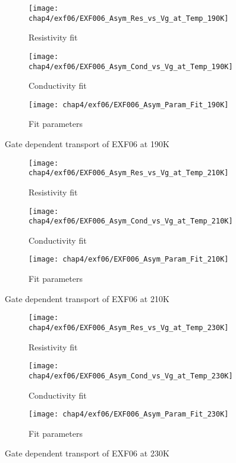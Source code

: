 \documentclass[../Matt_Gebert_Honours_Thesis.tex]{subfiles}
\begin{document}
	\begin{figure}[H]
		\centering
		\begin{subfigure}{0.4\textwidth}
			\centering
			\texttt{[image: chap4/exf06/EXF006\_Asym\_Res\_vs\_Vg\_at\_Temp\_190K]}
			\caption{Resistivity fit}
		\end{subfigure}
		\begin{subfigure}{0.4\textwidth}
			\centering
			\texttt{[image: chap4/exf06/EXF006\_Asym\_Cond\_vs\_Vg\_at\_Temp\_190K]}
			\caption{Conductivity fit}
		\end{subfigure}
		\begin{subfigure}{0.16\textwidth}
			\centering
			\texttt{[image: chap4/exf06/EXF006\_Asym\_Param\_Fit\_190K]}
			\caption{Fit parameters}
		\end{subfigure}
		\caption*{Gate dependent transport of EXF06 at 190K}
	\end{figure}
	\begin{figure}[H]
		\centering
		\begin{subfigure}{0.4\textwidth}
			\centering
			\texttt{[image: chap4/exf06/EXF006\_Asym\_Res\_vs\_Vg\_at\_Temp\_210K]}
			\caption{Resistivity fit}
		\end{subfigure}
		\begin{subfigure}{0.4\textwidth}
			\centering
			\texttt{[image: chap4/exf06/EXF006\_Asym\_Cond\_vs\_Vg\_at\_Temp\_210K]}
			\caption{Conductivity fit}
		\end{subfigure}
		\begin{subfigure}{0.16\textwidth}
			\centering
			\texttt{[image: chap4/exf06/EXF006\_Asym\_Param\_Fit\_210K]}
			\caption{Fit parameters}
		\end{subfigure}
		\caption*{Gate dependent transport of EXF06 at 210K}
	\end{figure}
	\begin{figure}[H]
		\centering
		\begin{subfigure}{0.4\textwidth}
			\centering
			\texttt{[image: chap4/exf06/EXF006\_Asym\_Res\_vs\_Vg\_at\_Temp\_230K]}
			\caption{Resistivity fit}
		\end{subfigure}
		\begin{subfigure}{0.4\textwidth}
			\centering
			\texttt{[image: chap4/exf06/EXF006\_Asym\_Cond\_vs\_Vg\_at\_Temp\_230K]}
			\caption{Conductivity fit}
		\end{subfigure}
		\begin{subfigure}{0.16\textwidth}
			\centering
			\texttt{[image: chap4/exf06/EXF006\_Asym\_Param\_Fit\_230K]}
			\caption{Fit parameters}
		\end{subfigure}
		\caption*{Gate dependent transport of EXF06 at 230K}
	\end{figure}
\end{document}
